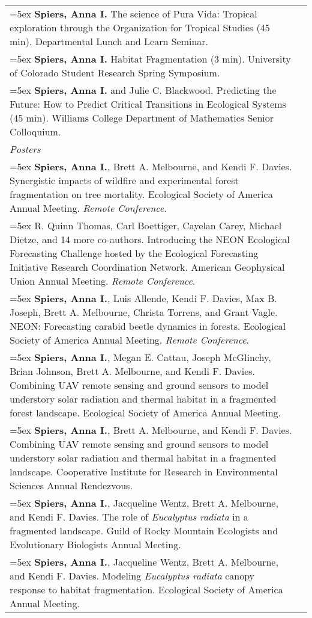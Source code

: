 \begin{longtable}{@{}>{\raggedright}p{5.25in} @{} >{\raggedleft}X@{}}
\hangindent=5ex \textbf{Spiers, Anna I.} The science of Pura Vida: Tropical exploration through the Organization for Tropical Studies (45 min). Departmental Lunch and Learn Seminar. &  2019 \tabularnewline %

\hangindent=5ex \textbf{Spiers, Anna I.} Habitat Fragmentation (3 min). University of Colorado Student Research Spring Symposium. & 2018 \tabularnewline %

\hangindent=5ex \textbf{Spiers, Anna I.} and Julie C. Blackwood. Predicting the Future: How to Predict Critical Transitions in Ecological Systems (45 min). Williams College Department of Mathematics Senior Colloquium. & 2014 \tabularnewline %


\emph{Posters}  \tabularnewline

\hangindent=5ex \textbf{Spiers, Anna I.}, Brett A. Melbourne, and Kendi F. Davies. Synergistic impacts of wildfire and experimental forest fragmentation on tree mortality. Ecological Society of America Annual Meeting. \emph{Remote Conference}. &  2021 \tabularnewline %

\hangindent=5ex R. Quinn Thomas, Carl Boettiger, Cayelan Carey, Michael Dietze, and 14 more co-authors. Introducing the NEON Ecological Forecasting Challenge hosted by the Ecological Forecasting Initiative Research Coordination Network. American Geophysical Union Annual Meeting. \emph{Remote Conference}. & 2020 \tabularnewline %

\hangindent=5ex \textbf{Spiers, Anna I.}, Luis Allende, Kendi F. Davies, Max B. Joseph, Brett A. Melbourne, Christa Torrens, and Grant Vagle. NEON: Forecasting carabid beetle dynamics in forests. Ecological Society of America Annual Meeting. \emph{Remote Conference}. &  2020 \tabularnewline %

\hangindent=5ex \textbf{Spiers, Anna I.}, Megan E. Cattau, Joseph McGlinchy, Brian Johnson, Brett A. Melbourne, and Kendi F. Davies.  Combining UAV remote sensing and ground sensors to model understory solar radiation and thermal habitat in a fragmented forest landscape. Ecological Society of America Annual Meeting. &  2019 \tabularnewline %

\hangindent=5ex \textbf{Spiers, Anna I.}, Brett A. Melbourne, and Kendi F. Davies.  Combining UAV remote sensing and ground sensors to model understory solar radiation and thermal habitat in a fragmented landscape. Cooperative Institute for Research in Environmental Sciences Annual Rendezvous. &  2019 \tabularnewline %

\hangindent=5ex \textbf{Spiers, Anna I.}, Jacqueline Wentz, Brett A. Melbourne, and Kendi F. Davies.  The role of \emph{Eucalyptus radiata} in a fragmented landscape. Guild of Rocky Mountain Ecologists and Evolutionary Biologists Annual Meeting. &  2018 \tabularnewline %

\hangindent=5ex \textbf{Spiers, Anna I.}, Jacqueline Wentz, Brett A. Melbourne, and Kendi F. Davies.  Modeling \emph{Eucalyptus radiata} canopy response to habitat fragmentation. Ecological Society of America Annual Meeting. &  2018 \tabularnewline %

\end{longtable}
